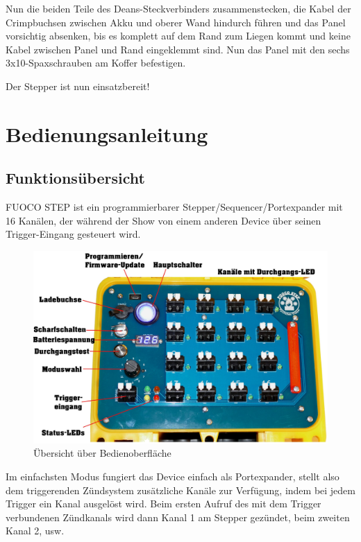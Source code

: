 \documentclass[paper=a4, open=any, numbers=noenddot]{scrbook}
\begin{document}
			Nun die beiden Teile des Deans-Steckverbinders zusammenstecken, die Kabel der Crimpbuchsen zwischen Akku und oberer Wand hindurch führen und das Panel vorsichtig absenken, bis es komplett auf dem Rand zum Liegen kommt und keine Kabel zwischen Panel und Rand eingeklemmt sind. Nun das Panel mit den sechs 3x10-Spaxschrauben am Koffer befestigen.

			\begin{center}
				Der Stepper ist nun einsatzbereit!
			\end{center}

			\cleardoublepage
\part{Bedienungsanleitung}

	\chapter{Funktionsübersicht}

		FUOCO STEP ist ein programmierbarer Stepper/Sequencer/Portexpander mit 16 Kanälen, der während der Show von einem anderen Device über seinen Trigger-Eingang gesteuert wird.

		\begin{figure}[!b]
			\centering\includegraphics[width=\textwidth]{Bilder/oberflaeche}
			\caption{Übersicht über Bedienoberfläche}
			\label{fig:paneldescription}
		\end{figure}

		Im einfachsten Modus fungiert das Device einfach als Portexpander, stellt also dem triggerenden Zündsystem zusätzliche Kanäle zur Verfügung, indem bei jedem Trigger ein Kanal ausgelöst wird. Beim ersten Aufruf des mit dem Trigger verbundenen Zündkanals wird dann Kanal 1 am Stepper gezündet, beim zweiten Kanal 2, usw.
\end{document}
